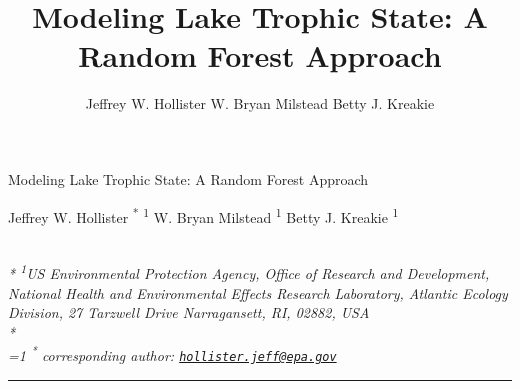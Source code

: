 \documentclass[11pt,]{article}
\title{Modeling Lake Trophic State: A Random Forest Approach}
\author{
Jeffrey W. Hollister
W. Bryan Milstead
Betty J. Kreakie
}
\date{}
\begin{document}
\begin{singlespace}
\begin{center}
\huge Modeling Lake Trophic State: A Random Forest Approach
\end{center}
\begin{center}
\large
Jeffrey W. Hollister \textsuperscript{*} \textsuperscript{1} 
W. Bryan Milstead \textsuperscript{1} 
Betty J. Kreakie \textsuperscript{1} 
\end{center}
\begin{justify}
\footnotesize \emph{ 
\\*
\textsuperscript{1}US Environmental Protection Agency, Office of Research and Development,
National Health and Environmental Effects Research Laboratory, Atlantic
Ecology Division, 27 Tarzwell Drive Narragansett, RI, 02882, USA\\*
}
\setcounter{num}{1}
\\[0.1cm]
\footnotesize \emph{ 
\ifnum\value{num}=1%
\textsuperscript{*} corresponding author:
\fi
\href{mailto:hollister.jeff@epa.gov}{\nolinkurl{hollister.jeff@epa.gov}}
}
\end{justify}
\normalsize

\end{singlespace}


\singlespace

\vspace{2mm}

\hrule
\end{document}
